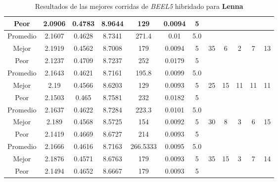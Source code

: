 \begin{table}[h!]
\begin{center}
\begin{tabular}{|c|c|c|c|c|c|c|c|c|c|c|c|}
            \cline{1-7}
            Peor & 2.0906 & 0.4783  & 8.9644 & 129 & 0.0094 & 5 &  &  &  &  & \\
        \hline
        \hline
            Promedio  & 2.1607 & 0.4628 & 8.7341 & 271.4 & 0.01 & 5.0 &  &  &  &  & \\
            \cline{1-7}
            Mejor & 2.1919 & 0.4562  & 8.7008 & 179 & 0.0094 & 5 & 35 & 6 & 2 & 7 & 13\\
            \cline{1-7}
            Peor & 2.1237 & 0.4709  & 8.7237 & 252 & 0.0179 & 5 &  &  &  &  & \\
        \hline
        \hline
            Promedio  & 2.1643 & 0.4621 & 8.7161 & 195.8 & 0.0099 & 5.0 &  &  &  &  & \\
            \cline{1-7}
            Mejor & 2.19 & 0.4566  & 8.6203 & 129 & 0.0093 & 5 & 25 & 15 & 11 & 11 & 11\\
            \cline{1-7}
            Peor & 2.1503 & 0.465  & 8.7581 & 232 & 0.0182 & 5 &  &  &  &  & \\
        \hline
        \hline
            Promedio  & 2.1637 & 0.4622 & 8.7284 & 223.3 & 0.0101 & 5.0 &  &  &  &  & \\
            \cline{1-7}
            Mejor & 2.189 & 0.4568  & 8.5725 & 154 & 0.0092 & 5 & 30 & 8 & 3 & 6 & 15\\
            \cline{1-7}
            Peor & 2.1419 & 0.4669  & 8.6727 & 214 & 0.0093 & 5 &  &  &  &  & \\
        \hline
        \hline
            Promedio  & 2.1666 & 0.4616 & 8.7163 & 266.5333 & 0.0095 & 5.0 &  &  &  &  & \\
            \cline{1-7}
            Mejor & 2.1876 & 0.4571  & 8.6763 & 179 & 0.0093 & 5 & 35 & 15 & 3 & 7 & 14\\
            \cline{1-7}
            Peor & 2.1494 & 0.4652  & 8.6667 & 179 & 0.0093 & 5 &  &  &  &  & \\
        \hline
        \end{tabular}
        \caption{Resultados de las mejores corridas de \emph{BEEL5} hibridado para {\bf Lenna}}
        \label{tb:tableBEEL5}
    \end{center}
\end{table}
